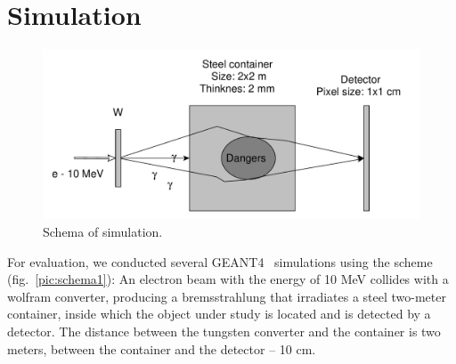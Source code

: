 \documentclass[a4paper]{panl}
\begin{document}
\section*{Simulation}
\begin{figure}[t]
    \begin{center}
        \includegraphics[width=120mm]{figures_eng/yed_schema_1.pdf}
        \vspace{-3mm}
        \caption{Schema of simulation.}
    \end{center}
    \vspace{-5mm}
\end{figure}
For evaluation, we conducted several GEANT4~\cite{ALLISON2016186} simulations using the scheme (fig.~\ref{pic:schema1}):
An electron beam with the energy of 10 MeV collides with a wolfram converter, producing a bremsstrahlung that irradiates a steel two-meter container, inside which the object under study is located and is detected by a detector. The distance between the tungsten converter and the container is two meters, between the container and the detector -- 10 cm.
\end{document}

